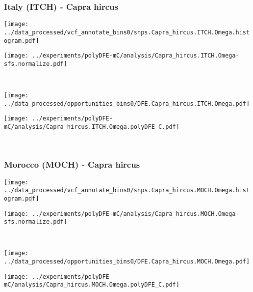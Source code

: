 \subsubsection{Italy (ITCH) - Capra hircus}

\begin{minipage}{0.49\linewidth}
    \texttt{[image: ../data\_processed/vcf\_annotate\_bins0/snps.Capra\_hircus.ITCH.Omega.histogram.pdf]}
\end{minipage}
\begin{minipage}{0.49\linewidth}
    \texttt{[image: ../experiments/polyDFE-mC/analysis/Capra\_hircus.ITCH.Omega-sfs.normalize.pdf]}
\end{minipage}
\\
\begin{minipage}{0.49\linewidth}
    \texttt{[image: ../data\_processed/opportunities\_bins0/DFE.Capra\_hircus.ITCH.Omega.pdf]}
\end{minipage}
\begin{minipage}{0.49\linewidth}
    \texttt{[image: ../experiments/polyDFE-mC/analysis/Capra\_hircus.ITCH.Omega.polyDFE\_C.pdf]}
\end{minipage}
\\

\subsubsection{Morocco (MOCH) - Capra hircus}

\begin{minipage}{0.49\linewidth}
    \texttt{[image: ../data\_processed/vcf\_annotate\_bins0/snps.Capra\_hircus.MOCH.Omega.histogram.pdf]}
\end{minipage}
\begin{minipage}{0.49\linewidth}
    \texttt{[image: ../experiments/polyDFE-mC/analysis/Capra\_hircus.MOCH.Omega-sfs.normalize.pdf]}
\end{minipage}
\\
\begin{minipage}{0.49\linewidth}
    \texttt{[image: ../data\_processed/opportunities\_bins0/DFE.Capra\_hircus.MOCH.Omega.pdf]}
\end{minipage}
\begin{minipage}{0.49\linewidth}
    \texttt{[image: ../experiments/polyDFE-mC/analysis/Capra\_hircus.MOCH.Omega.polyDFE\_C.pdf]}
\end{minipage}
\\

